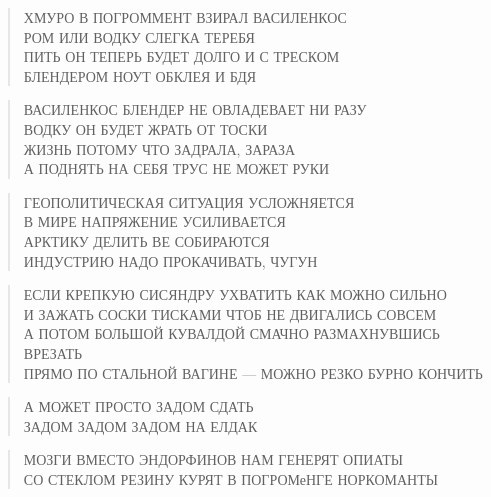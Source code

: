 \poemtitle{***}
\begin{verse}
ХМУРО В ПОГРОММЕНТ ВЗИРАЛ ВАСИЛЕНКОС\\
РОМ ИЛИ ВОДКУ СЛЕГКА ТЕРЕБЯ\\
ПИТЬ ОН ТЕПЕРЬ БУДЕТ ДОЛГО И С ТРЕСКОМ\\
БЛЕНДЕРОМ НОУТ ОБКЛЕЯ И БДЯ
\end{verse}

\poemtitle{***}
\begin{verse}
ВАСИЛЕНКОС БЛЕНДЕР НЕ ОВЛАДЕВАЕТ НИ РАЗУ\\
ВОДКУ ОН БУДЕТ ЖРАТЬ ОТ ТОСКИ\\
ЖИЗНЬ ПОТОМУ ЧТО ЗАДРАЛА, ЗАРАЗА\\
А ПОДНЯТЬ НА СЕБЯ ТРУС НЕ МОЖЕТ РУКИ
\end{verse}

\poemtitle{***}
\begin{verse}
ГЕОПОЛИТИЧЕСКАЯ СИТУАЦИЯ УСЛОЖНЯЕТСЯ\\
В МИРЕ НАПРЯЖЕНИЕ УСИЛИВАЕТСЯ\\
АРКТИКУ ДЕЛИТЬ ВЕ СОБИРАЮТСЯ\\
ИНДУСТРИЮ НАДО ПРОКАЧИВАТЬ, ЧУГУН
\end{verse}

\poemtitle{***}
\begin{verse}
ЕСЛИ КРЕПКУЮ СИСЯНДРУ УХВАТИТЬ КАК МОЖНО СИЛЬНО\\
И ЗАЖАТЬ СОСКИ ТИСКАМИ ЧТОБ НЕ ДВИГАЛИСЬ СОВСЕМ\\
А ПОТОМ БОЛЬШОЙ КУВАЛДОЙ СМАЧНО РАЗМАХНУВШИСЬ ВРЕЗАТЬ\\
ПРЯМО ПО СТАЛЬНОЙ ВАГИНЕ — МОЖНО РЕЗКО БУРНО КОНЧИТЬ
\end{verse}

\poemtitle{***}
\begin{verse}
А МОЖЕТ ПРОСТО ЗАДОМ СДАТЬ\\
ЗАДОМ ЗАДОМ ЗАДОМ НА ЕЛДАК
\end{verse}

\poemtitle{***}
\begin{verse}
МОЗГИ ВМЕСТО ЭНДОРФИНОВ НАМ ГЕНЕРЯТ ОПИАТЫ\\
СО СТЕКЛОМ РЕЗИНУ КУРЯТ В ПОГРОМеНГЕ НОРКОМАНТЫ
\end{verse}

